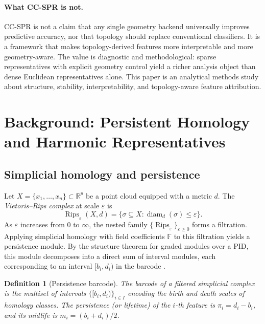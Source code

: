 \documentclass[11pt]{article}
\newtheorem{definition}[theorem]{Definition}
\DeclareMathOperator{\Rips}{Rips}
\DeclareMathOperator{\diam}{diam}
\begin{document}
\paragraph{What CC-SPR is not.}
CC-SPR is not a claim that any single geometry backend universally improves predictive accuracy, nor that topology should replace conventional classifiers.
It is a framework that makes topology-derived features more interpretable and more geometry-aware.
The value is diagnostic and methodological: sparse representatives with explicit geometry control yield a richer analysis object than dense Euclidean representatives alone.
This paper is an analytical methods study about structure, stability, interpretability, and topology-aware feature attribution.

\section{Background: Persistent Homology and Harmonic Representatives}
\label{sec:background}

\subsection{Simplicial homology and persistence}

Let $X = \{x_1, \ldots, x_n\} \subset \mathbb{R}^p$ be a point cloud equipped with a metric $d$.
The \emph{Vietoris--Rips complex} at scale $\varepsilon$ is
\[
\Rips_\varepsilon(X, d) = \bigl\{ \sigma \subseteq X : \diam_d(\sigma) \le \varepsilon \bigr\}.
\]
As $\varepsilon$ increases from $0$ to $\infty$, the nested family $\{\Rips_\varepsilon\}_{\varepsilon \ge 0}$ forms a filtration.
Applying simplicial homology with field coefficients $\mathbb{F}$ to this filtration yields a persistence module.
By the structure theorem for graded modules over a PID, this module decomposes into a direct sum of interval modules, each corresponding to an interval $[b_i, d_i)$ in the barcode \cite{zomorodian2005}.

\begin{definition}[Persistence barcode]\label{def:barcode}
The \emph{barcode} of a filtered simplicial complex is the multiset of intervals $\{[b_i, d_i)\}_{i \in I}$ encoding the birth and death scales of homology classes.
The \emph{persistence} (or \emph{lifetime}) of the $i$-th feature is $\pi_i = d_i - b_i$, and its \emph{midlife} is $m_i = (b_i + d_i)/2$.
\end{definition}
\end{document}
